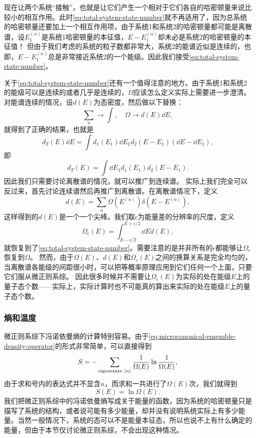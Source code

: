 \documentclass[hyperref, UTF8, a4paper]{ctexart}
\begin{document}
现在让两个系统“接触”，也就是让它们产生一个相对于它们各自的哈密顿量来说比较小的相互作用。此时\eqref{eq:total-system-state-number}就不再适用了，因为总系统的哈密顿量还要加上一个相互作用项，由于系统1和系统2的哈密顿量都可能是离散谱，设$E_1^{(n)}$是系统1哈密顿量的本征值，$E-E_1^{(n)}$却未必是系统2的哈密顿量的本征值！
但由于我们考虑的系统的粒子数都非常大，系统2的能谱近似是连续的，也即，$E-E_1^{(n)}$总是非常接近系统2的一个能级。因此我们接受\eqref{eq:total-system-state-number}。

关于\eqref{eq:total-system-state-number}还有一个值得注意的地方。由于系统1和系统2的能级可以是连续的或者几乎是连续的，$\Omega$应该怎么定义实际上需要进一步澄清。
对能谱连续的情况，设$d(E)$为态密度，然后做以下替换：
\[
    \sum_n \longrightarrow \int , \quad \Omega \longrightarrow d(E) \dd{E},
\]
就得到了正确的结果，也就是
\[
    d_T(E) \dd{E} = \int d_1 (E_1) \dd{E_1} d_2 (E - E_1) (\dd{E} - \dd{E_1}),
\]
即
\begin{equation}
    d_T(E) = \int \dd{E_1} d_1 (E_1) d_2 (E - E_1).
    \label{eq:canonical-state-continue}
\end{equation}
因此我们只需要讨论离散谱的情况，就可以推广到连续谱。
实际上我们完全可以反过来，首先讨论连续谱然后再推广到离散谱。在离散谱情况下，定义
\[
    d(E) = \sum_n \Omega(E^{(n)}) \delta(E - E^{(n)}),
\]
这样得到的$d(E)$是一个一个尖峰。我们取$\epsilon$为能量差的分辨率的尺度，定义
\[
    \Omega_\epsilon (E) = \int_{E-\epsilon/2}^{E+\epsilon/2} \dd{E} d(E),
\]
就恢复到了\eqref{eq:total-system-state-number}。需要注意的是并非所有的$\epsilon$都能够让$\Omega_\epsilon$恢复到$\Omega$。
然而，由于$\Omega(E)$、$d(E)$和$\Omega_\epsilon(E)$之间的换算关系是完全均匀的，当离散谱各能级的间距很小时，可以把等概率原理应用到它们任何一个上面，只要它们服从微正则系综。
因此很多时候并不需要让$\Omega_\epsilon(E)$为实际的处在能级$E$上的量子态个数——实际上，实际计算时也不可能真的算出来实际的处在能级$E$上的量子态个数。

\subsubsection{熵和温度}\label{sec:entropy-and-temperature}

微正则系综下冯诺依曼熵的计算特别容易。由于\eqref{eq:microcanonical-ensemble-density-operator}的形式非常简单，可以直接得到
\[
    S = - \sum_\text{eigenstate $\ket{n}$} \frac{1}{\Omega(E)} \ln \frac{1}{\Omega(E)},
\]
由于求和号内的表达式并不显含$n$，而求和一共进行了$\Omega(E)$次，我们就得到
\begin{equation}
    S(E) = \ln \Omega(E).
    \label{eq:entropy-and-state-number}
\end{equation}
我们把微正则系综中的冯诺依曼熵写成关于能量的函数，因为系统的哈密顿量只是描写了系统的结构，或者说可能有多少能量，却并没有说明系统实际上有多少能量。当然一般情况下，系统的态可以不是能量本征态，所以也说不上有什么确定的能量，但由于本节仅讨论微正则系综，不会出现这种情况。
\end{document}
